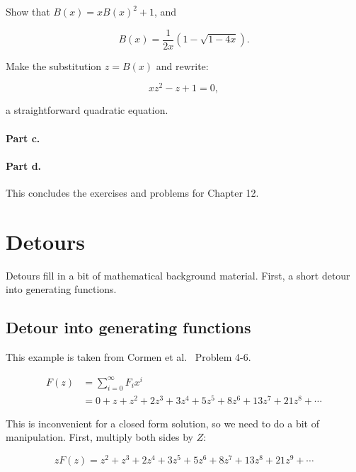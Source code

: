 \documentclass{article}
\begin{document}
Show that $B(x) = xB(x)^2 + 1$, and

\begin{equation}
B(x) = \frac{1}{2x}(1-\sqrt{1-4x}).
\end{equation}

Make the substitution $z = B(x)$ and rewrite:

\begin{equation}
  xz^2 - z + 1 = 0,
\end{equation}

a straightforward quadratic equation.

\paragraph{Part c.}

\paragraph{Part d.}

This concludes the exercises and problems for Chapter 12.

\appendix

\section{Detours}

Detours fill in a bit of mathematical background material.
First, a short detour into generating functions.

\subsection{Detour into generating functions}

This example is taken from Cormen et al.~\cite[p. 74]{cormen:th:1990}
Problem 4-6.

\begin{align}
F(z) & = \sum_{i=0}^{\infty} F_ix^i\\
\label{eqn:fibonacci_opsgf}
     & = 0 + z + z^2 + 2z^3 + 3z^4 + 5z^5 + 8z^6 + 13z^7 + 21z^8+\cdots
\end{align}

This is inconvenient for a closed form solution, so we need to do a bit of
manipulation. First, multiply both sides by $Z$:

\begin{equation}
\label{eqn:zfibonacci_opsgf}
zF(z) = z^2 + z^3 + 2z^4 + 3z^5 + 5z^6 + 8z^7 + 13z^8 + 21z^9+\cdots
\end{equation}
\end{document}
